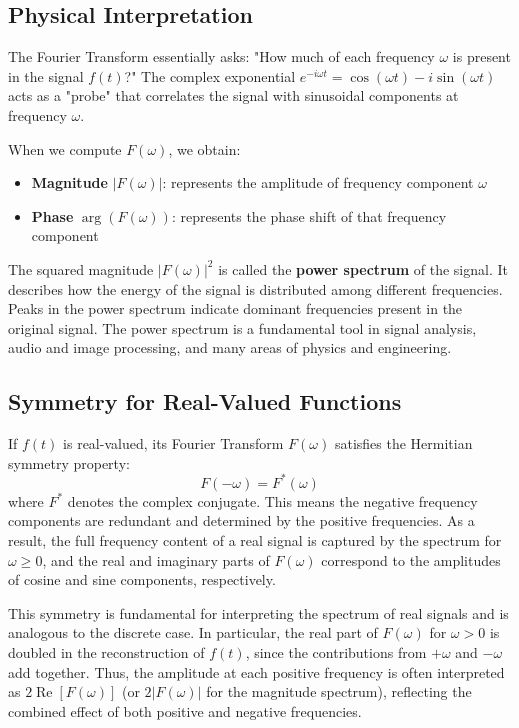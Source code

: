 \documentclass[11pt,a4paper]{article}
\begin{document}
\subsection{Physical Interpretation}

The Fourier Transform essentially asks: "How much of each frequency $\omega$ is present in the signal $f(t)$?" The complex exponential $e^{-i\omega t} = \cos(\omega t) - i\sin(\omega t)$ acts as a "probe" that correlates the signal with sinusoidal components at frequency $\omega$.

When we compute $F(\omega)$, we obtain:
\begin{itemize}
    \item \textbf{Magnitude} $|F(\omega)|$: represents the amplitude of frequency component $\omega$
    \item \textbf{Phase} $\arg(F(\omega))$: represents the phase shift of that frequency component
\end{itemize}

The squared magnitude $|F(\omega)|^2$ is called the \textbf{power spectrum} of the signal. It describes how the energy of the signal is distributed among different frequencies. Peaks in the power spectrum indicate dominant frequencies present in the original signal. The power spectrum is a fundamental tool in signal analysis, audio and image processing, and many areas of physics and engineering.

\subsection{Symmetry for Real-Valued Functions}

If $f(t)$ is real-valued, its Fourier Transform $F(\omega)$ satisfies the Hermitian symmetry property:
\begin{equation}
F(-\omega) = F^*(\omega)
\end{equation}
where $F^*$ denotes the complex conjugate. This means the negative frequency components are redundant and determined by the positive frequencies. As a result, the full frequency content of a real signal is captured by the spectrum for $\omega \geq 0$, and the real and imaginary parts of $F(\omega)$ correspond to the amplitudes of cosine and sine components, respectively.

This symmetry is fundamental for interpreting the spectrum of real signals and is analogous to the discrete case. In particular, the real part of $F(\omega)$ for $\omega > 0$ is doubled in the reconstruction of $f(t)$, since the contributions from $+\omega$ and $-\omega$ add together. Thus, the amplitude at each positive frequency is often interpreted as $2\operatorname{Re}[F(\omega)]$ (or $2|F(\omega)|$ for the magnitude spectrum), reflecting the combined effect of both positive and negative frequencies.
\end{document}
